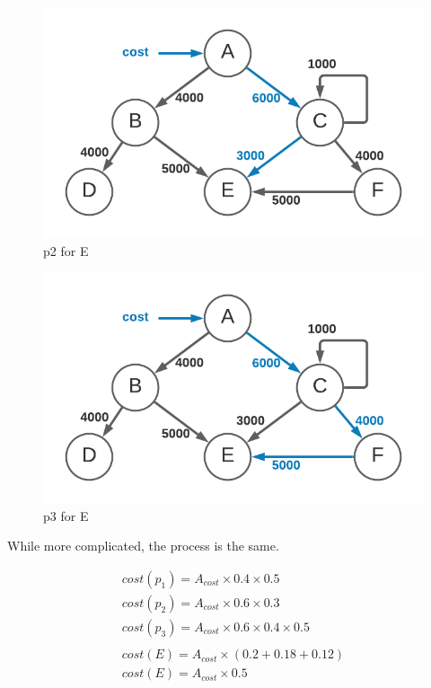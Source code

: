 \documentclass[10pt, a4paper, twocolumn]{article}
\begin{document}
      \begin{figure}[H]
        \centering
        \includegraphics[width=\linewidth]{./cost-attribution-cost-ep2.png}
        \caption{p2 for E}
        \label{figure:6}
      \end{figure}

      \begin{figure}[H]
        \centering
        \includegraphics[width=\linewidth]{./cost-attribution-cost-ep3.png}
        \caption{p3 for E}
        \label{figure:7}
      \end{figure}

      While more complicated, the process is the same.

      \begin{gather*}
        cost(p_{1}) = A_{cost} \times 0.4 \times 0.5 \\
        cost(p_{2}) = A_{cost} \times 0.6 \times 0.3 \\
        cost(p_{3}) = A_{cost} \times 0.6 \times 0.4 \times 0.5 \\
        \\
        cost(E) = A_{cost} \times (0.2 + 0.18 + 0.12) \\
        cost(E) = A_{cost} \times 0.5 \\
      \end{gather*}
\end{document}
